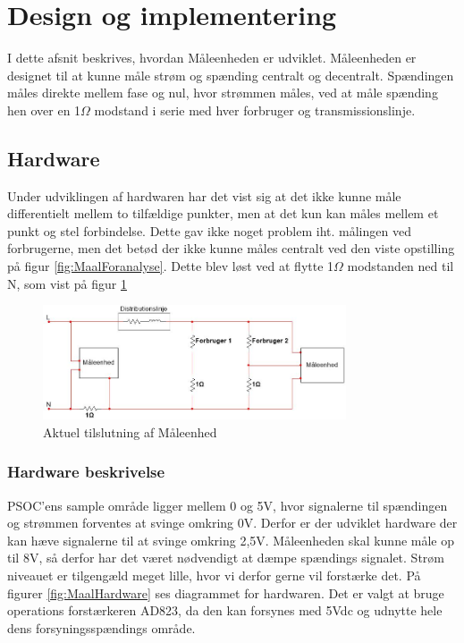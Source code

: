 
\section{Design og implementering}
I dette afsnit beskrives, hvordan Måleenheden er udviklet. Måleenheden er designet til at kunne måle strøm og spænding centralt og decentralt. Spændingen måles direkte mellem fase og nul, hvor strømmen måles, ved at måle spænding hen over en 1$\Omega$ modstand i serie med hver forbruger og transmissionslinje. 

\subsection{Hardware}

Under udviklingen af hardwaren har det vist sig at det ikke kunne måle differentielt mellem to tilfældige punkter, men at det kun kan måles mellem et punkt og stel forbindelse. Dette gav ikke noget problem iht. målingen ved forbrugerne, men det betød der ikke kunne måles centralt ved den viste opstilling på figur \ref{fig:MaalForanalyse}. Dette blev løst ved at flytte 1$\Omega$ modstanden ned til N, som vist på figur \ref{fig:MaalAktuel}

\begin{figure}[H] %
	\centering
	\includegraphics[width=0.8\textwidth]{figure/MaalAktuel}
	\caption{Aktuel tilslutning af Måleenhed}
	\label{fig:MaalAktuel}
\end{figure} 


\subsubsection{Hardware beskrivelse}
PSOC'ens sample område ligger mellem 0 og 5V, hvor signalerne til spændingen og strømmen forventes at svinge omkring 0V. Derfor er der udviklet hardware der kan hæve signalerne til at svinge omkring 2,5V. Måleenheden skal kunne måle op til 8V, så derfor har det været nødvendigt at dæmpe spændings signalet. Strøm niveauet er tilgengæld meget lille, hvor vi derfor gerne vil forstærke det. På figurer \ref{fig:MaalHardware} ses diagrammet for hardwaren. Det er valgt at bruge operations forstærkeren AD823, da den kan forsynes med 5Vdc og udnytte hele dens forsyningsspændings område.  
  

